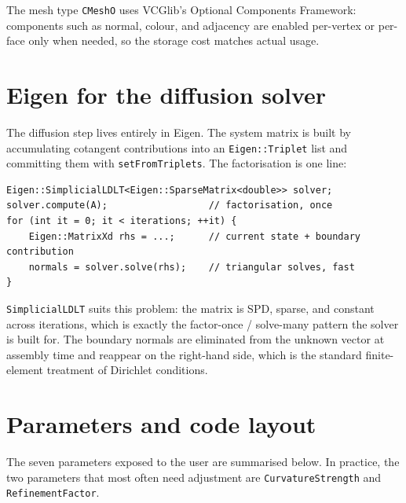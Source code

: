 The mesh type \texttt{CMeshO} uses VCGlib's Optional Components Framework: components such as normal, colour, and adjacency are enabled per-vertex or per-face only when needed, so the storage cost matches actual usage.

\section{Eigen for the diffusion solver}

The diffusion step lives entirely in Eigen. The system matrix is built by accumulating cotangent contributions into an \texttt{Eigen::Triplet} list and committing them with \texttt{setFromTriplets}. The factorisation is one line:

\begin{lstlisting}
Eigen::SimplicialLDLT<Eigen::SparseMatrix<double>> solver;
solver.compute(A);                  // factorisation, once
for (int it = 0; it < iterations; ++it) {
    Eigen::MatrixXd rhs = ...;      // current state + boundary contribution
    normals = solver.solve(rhs);    // triangular solves, fast
}
\end{lstlisting}

\texttt{SimplicialLDLT} suits this problem: the matrix is SPD, sparse, and constant across iterations, which is exactly the factor-once / solve-many pattern the solver is built for. The boundary normals are eliminated from the unknown vector at assembly time and reappear on the right-hand side, which is the standard finite-element treatment of Dirichlet conditions.

\section{Parameters and code layout}

The seven parameters exposed to the user are summarised below. In practice, the two parameters that most often need adjustment are \texttt{CurvatureStrength} and \texttt{RefinementFactor}.

